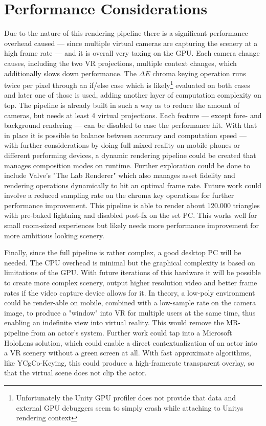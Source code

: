 \section{Performance Considerations}

Due to the nature of this rendering pipeline there is a significant performance 
overhead caused --- since multiple virtual cameras are capturing the scenery at 
a high frame rate --- and it is overall very taxing on the GPU. Each camera 
change causes, including the two VR projections, multiple context changes, 
which additionally slows down performance. The $\Delta E$ chroma keying 
operation runs twice per pixel through an if/else case which is 
likely\footnote{Unfortunately the Unity GPU profiler does not provide that 
data and external GPU debuggers seem to simply crash while attaching to Unitys 
rendering context} evaluated on both cases and later one of those is used, 
adding another layer of computation complexity on top. 
\newline
The pipeline is already built in such a way as to reduce the amount of cameras, 
but needs at least 4 virtual projections. Each feature --- except fore- and 
background  rendering --- can be disabled to ease the performance hit. With 
that in place it is possible to balance between accuracy and computation speed 
--- with further considerations by doing full mixed reality on mobile phones or 
different performing devices, a dynamic rendering pipeline could be created 
that manages composition modes on runtime. Further exploration could be done to 
include Valve's "The Lab Renderer" which also manages asset fidelity and 
rendering operations dynamically to hit an optimal frame rate. Future work 
could involve a reduced sampling rate on the chroma key operations for further 
performance improvement.
\newline
This pipeline is able to render about 120.000 triangles with pre-baked 
lightning and disabled post-fx on the set PC. This works well for small 
room-sized experiences but likely needs more performance improvement for 
more ambitious looking scenery.

Finally, since the full pipeline is rather complex, a good desktop PC will be 
needed. The CPU overhead is minimal but the graphical complexity is based on 
limitations of the GPU. With future iterations of this hardware it will be 
possible to create more complex scenery, output higher resolution video and 
better frame rates if the video capture device allows for it.
\newline
In theory, a low-poly environment could be render-able on mobile, combined with 
a low-sample rate on the camera image, to produce a "window" into VR for 
multiple users at the same time, thus enabling an indefinite view into virtual 
reality. This would remove the MR-pipeline from an actor's system. Further work 
could tap into a Microsoft HoloLens solution, which could enable a direct 
contextualization of an actor into a VR scenery without a green screen at all. 
With fast approximate algorithms, like YCgCo-Keying, this could produce a 
high-framerate transparent overlay, so that the virtual scene does not clip the 
actor.

